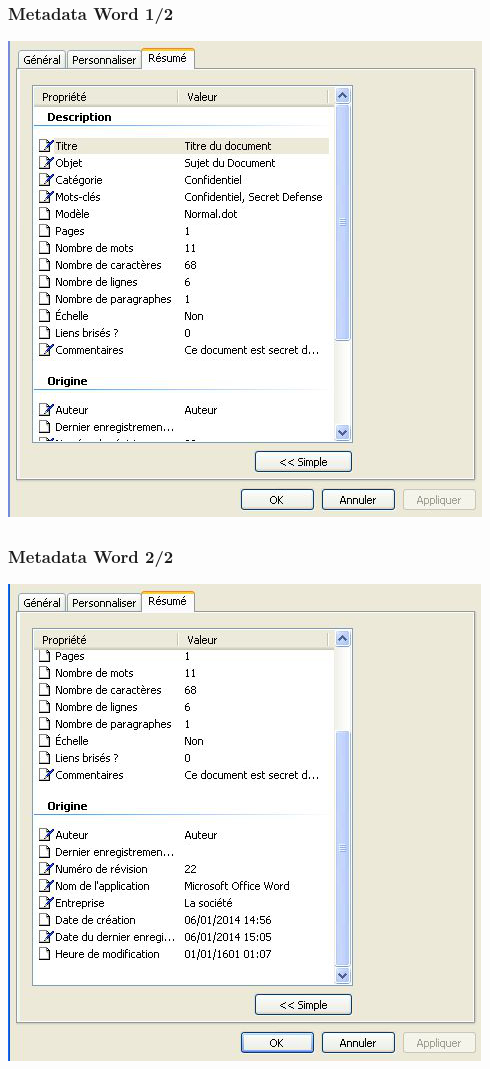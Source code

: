 \documentclass{beamer}
\begin{document}
\begin{frame}
\frametitle{Metadata Word 1/2}
\begin{center}
\includegraphics[scale=0.5] {./images/Word01.jpg} 
\end{center}
\end{frame}

\begin{frame}
\frametitle{Metadata Word 2/2}
\begin{center}
\includegraphics[scale=0.5] {./images/Word02.jpg}
\end{center}
\end{frame}
\end{document}
